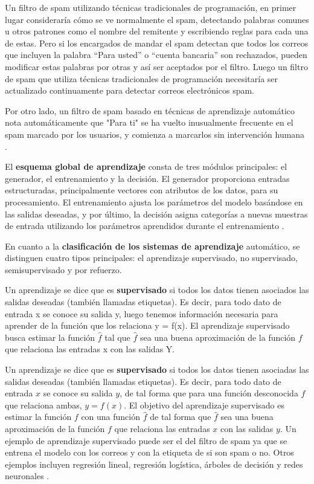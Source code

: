 Un filtro de spam utilizando técnicas tradicionales de programación, en primer lugar consideraría cómo se ve normalmente el spam, detectando palabras comunes u otros patrones como el nombre del remitente y escribiendo reglas para cada una de estas. Pero si los encargados de mandar el spam detectan que todos los correos que incluyen la palabra ``Para usted'' o  ``cuenta bancaria'' son rechazados, pueden modificar estas palabras por otras y así ser aceptados por el filtro. Luego un filtro de spam que utiliza técnicas tradicionales de programación necesitaría ser actualizado continuamente para detectar correos electrónicos spam. 

Por otro lado, un filtro de spam basado en técnicas de aprendizaje automático nota automáticamente que "Para ti" se ha vuelto inusualmente frecuente en el spam marcado por los usuarios, y comienza a marcarlos sin intervención humana \citep{geron2022hands}.


\bigskip

El \textbf{esquema global de aprendizaje} consta de tres módulos principales: el generador, el entrenamiento y la decisión. El generador proporciona entradas estructuradas, principalmente vectores con atributos de los datos, para su procesamiento. El entrenamiento ajusta los parámetros del modelo basándose en las salidas deseadas, y por último, la decisión asigna categorías a nuevas muestras de entrada utilizando los parámetros aprendidos durante el entrenamiento \citep{pajares2021aprendizaje}.

\bigskip

En cuanto a la \textbf{clasificación de los sistemas de aprendizaje} automático, se distinguen cuatro tipos principales: el aprendizaje supervisado, no supervisado, semisupervisado y por refuerzo.

Un aprendizaje se dice que es \textbf{supervisado} si todos los datos tienen asociados las salidas deseadas (también llamadas etiquetas). Es decir, para todo dato de entrada x se conoce su salida y, luego tenemos información necesaria para aprender de la función que los relaciona y = f(x). El aprendizaje supervisado busca estimar la función $\hat{f}$ tal que $\hat{f}$ sea una buena aproximación de la función $f$ que relaciona las entradas x con las salidas Y.

Un aprendizaje se dice que es \textbf{supervisado} si todos los datos tienen asociadas las salidas deseadas (también llamadas etiquetas). Es decir, para todo dato de entrada \( x \) se conoce su salida \( y \), de tal forma que para una función desconocida $f$ que relaciona ambas, $y=f(x)$. El objetivo del aprendizaje supervisado es estimar la función \( f \) con una función \( \hat{f} \) de tal forma que \( \hat{f} \) sea una buena aproximación de la función \( f \) que relaciona las entradas \( x \) con las salidas \( y \). Un ejemplo de aprendizaje supervisado puede ser el del filtro de spam ya que se entrena el modelo con los correos y con la etiqueta de si son spam o no. Otros ejemplos incluyen regresión lineal, regresión logística, árboles de decisión y redes neuronales \citep{geron2022hands}.


